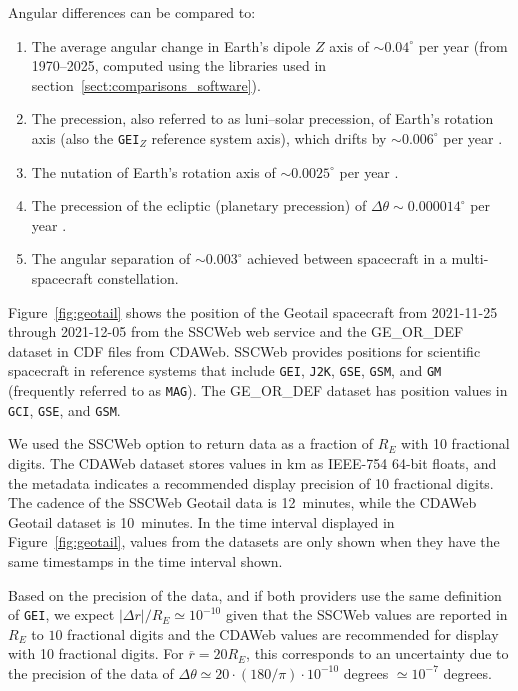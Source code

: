 \documentclass[draft]{agujournal2019}
\begin{document}
\noindent Angular differences can be compared to:
\begin{enumerate}
    \item The average angular change in Earth's dipole $Z$ axis of ${\sim} 0.04^\circ$ per year (from 1970--2025, computed using the libraries used in section~\ref{sect:comparisons_software}).

    \item The precession, also referred to as luni--solar precession, of Earth's rotation axis (also the \texttt{GEI}$_Z$ reference system axis), which drifts by ${\sim} 0.006^\circ$ per year \cite{Hapgood1995}.

    \item The nutation of Earth's rotation axis of ${\sim} 0.0025^\circ$ per year \cite{Hapgood1995}.

    \item The precession of the ecliptic (planetary precession) of $\Delta \theta {\sim} 0.000014^\circ$ per year \cite{Hapgood1995}.

    \item The angular separation of ${\sim}0.003^\circ$ achieved between spacecraft in a multi-spacecraft constellation.
\end{enumerate}

Figure~\ref{fig:geotail} shows the position of the Geotail spacecraft from 2021-11-25 through 2021-12-05 from the SSCWeb web service and the GE\_OR\_DEF dataset in CDF \cite{CDF2025} files from CDAWeb. SSCWeb provides positions for scientific spacecraft in reference systems that include \texttt{GEI}, \texttt{J2K}, \texttt{GSE}, \texttt{GSM}, and \texttt{GM} (frequently referred to as \texttt{MAG}). The GE\_OR\_DEF dataset has position values in \texttt{GCI}, \texttt{GSE}, and \texttt{GSM}.

We used the SSCWeb option to return data as a fraction of $R_E$ with 10 fractional digits. The CDAWeb dataset stores values in km as IEEE-754 64-bit floats, and the metadata indicates a recommended display precision of 10 fractional digits. The cadence of the SSCWeb Geotail data is 12~minutes, while the CDAWeb Geotail dataset is 10~minutes. In the time interval displayed in Figure~\ref{fig:geotail}, values from the datasets are only shown when they have the same timestamps in the time interval shown.

Based on the precision of the data, and if both providers use the same definition of \texttt{GEI}, we expect $|\Delta r|/R_E \simeq 10^{-10}$ given that the SSCWeb values are reported in $R_E$ to $10$ fractional digits and the CDAWeb values are recommended for display with 10 fractional digits. For $\overline{r}=20 R_E$, this corresponds to an uncertainty due to the precision of the data of $\Delta \theta \simeq 20\cdot (180/\pi) \cdot 10^{-10}$ degrees $\simeq 10^{-7}$ degrees.
\end{document}
